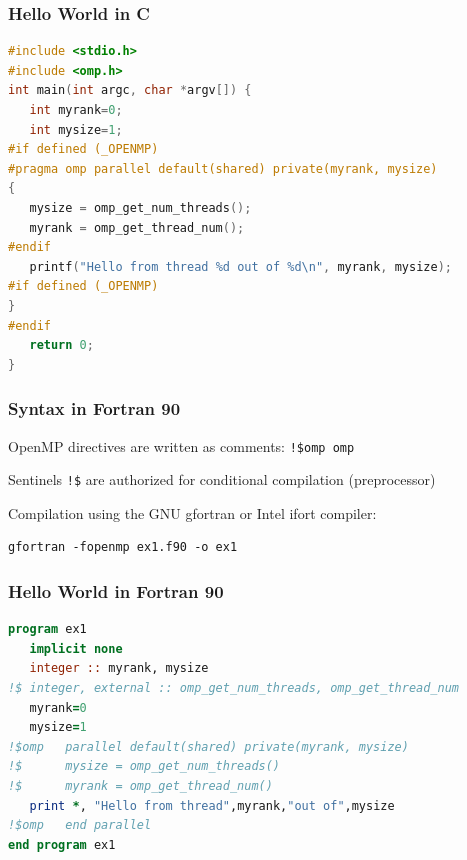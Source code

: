 \begin{frame}[containsverbatim]
  \frametitle{Hello World in C}

  \begin{lstlisting}[language=C++,frame=lines]
#include <stdio.h>
#include <omp.h>
int main(int argc, char *argv[]) {
   int myrank=0;
   int mysize=1;
#if defined (_OPENMP)
#pragma omp parallel default(shared) private(myrank, mysize)
{
   mysize = omp_get_num_threads();
   myrank = omp_get_thread_num();
#endif
   printf("Hello from thread %d out of %d\n", myrank, mysize);
#if defined (_OPENMP)
}
#endif
   return 0;
}
\end{lstlisting}
\end{frame}

\begin{frame}[containsverbatim]
  \frametitle{Syntax in Fortran 90}

  \begin{block}{}
    OpenMP directives are written as comments: \texttt{!\$omp omp}
  \end{block}
  \begin{block}{}
    Sentinels \texttt{!\$} are authorized for conditional compilation  (preprocessor)
  \end{block}


  Compilation using the GNU gfortran or Intel ifort compiler:
\begin{verbatim}
gfortran -fopenmp ex1.f90 -o ex1
\end{verbatim}
\end{frame}



\begin{frame}[containsverbatim]
  \frametitle{Hello World in Fortran 90}

  \begin{lstlisting}[language=Fortran,frame=lines]
program ex1
   implicit none
   integer :: myrank, mysize
!$ integer, external :: omp_get_num_threads, omp_get_thread_num
   myrank=0
   mysize=1
!$omp   parallel default(shared) private(myrank, mysize)
!$      mysize = omp_get_num_threads()
!$      myrank = omp_get_thread_num()
   print *, "Hello from thread",myrank,"out of",mysize
!$omp   end parallel
end program ex1
\end{lstlisting}
\end{frame}

